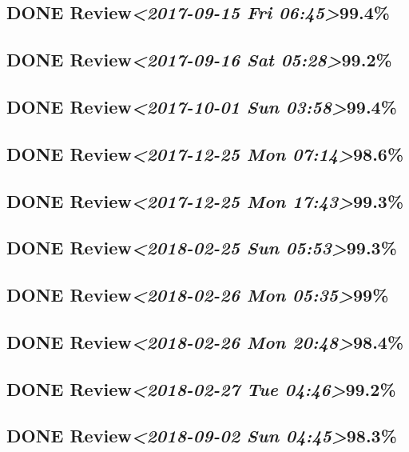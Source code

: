 \documentclass[11pt]{ctexart}
\begin{document}
\subsection{{\bfseries\sffamily DONE} Review\textit{<2017-09-15 Fri 06:45>}99.4\%}
\label{sec:org2f0b3f8}
\subsection{{\bfseries\sffamily DONE} Review\textit{<2017-09-16 Sat 05:28>}99.2\%}
\label{sec:org8dcf075}
\subsection{{\bfseries\sffamily DONE} Review\textit{<2017-10-01 Sun 03:58>}99.4\%}
\label{sec:org186801f}
\subsection{{\bfseries\sffamily DONE} Review\textit{<2017-12-25 Mon 07:14>}98.6\%}
\label{sec:orgbb10e39}
\subsection{{\bfseries\sffamily DONE} Review\textit{<2017-12-25 Mon 17:43>}99.3\%}
\label{sec:orgea56036}
\subsection{{\bfseries\sffamily DONE} Review\textit{<2018-02-25 Sun 05:53>}99.3\%}
\label{sec:orgf53415c}
\subsection{{\bfseries\sffamily DONE} Review\textit{<2018-02-26 Mon 05:35>}99\%}
\label{sec:org0fb856a}
\subsection{{\bfseries\sffamily DONE} Review\textit{<2018-02-26 Mon 20:48>}98.4\%}
\label{sec:org789bcd0}
\subsection{{\bfseries\sffamily DONE} Review\textit{<2018-02-27 Tue 04:46>}99.2\%}
\label{sec:org1ea5027}
\subsection{{\bfseries\sffamily DONE} Review\textit{<2018-09-02 Sun 04:45>}98.3\%}
\label{sec:org689093a}
\end{document}
